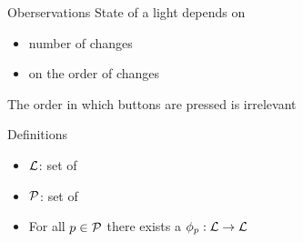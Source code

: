 \begin{frame}{Oberservations}
	State of a light depends on
	\begin{itemize}
		\item number of changes
		\item {} on the order of changes
	\end{itemize}
	
	\pause
	
	The order in which buttons are pressed is irrelevant
\end{frame}

\begin{frame}{Definitions}
	\begin{definition}
		\begin{itemize}
			\item $\mathcal{L}$: set of 
			\item $\mathcal{P}$: set of 
			\item For all $p \in \mathcal{P}$ there exists a $\phi_{p}: \mathcal{L} \rightarrow \mathcal{L}$
		\end{itemize}
	\end{definition}
\end{frame}
